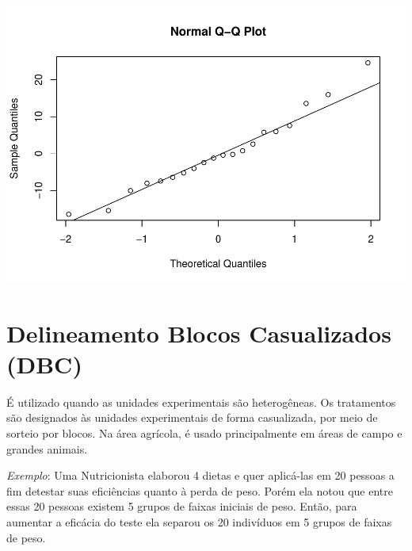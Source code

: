 \documentclass[12pt,brazil,]{book}
\begin{document}
\includegraphics{02-Delinexp_files/figure-latex/unnamed-chunk-8-1.pdf}

\hypertarget{delineamento-blocos-casualizados-dbc}{%
\section{Delineamento Blocos Casualizados
(DBC)}\label{delineamento-blocos-casualizados-dbc}}

É utilizado quando as unidades experimentais são heterogêneas. Os
tratamentos são designados às unidades experimentais de forma
casualizada, por meio de sorteio por blocos. Na área agrícola, é usado
principalmente em áreas de campo e grandes animais.

\emph{Exemplo}: Uma Nutricionista elaborou 4 dietas e quer aplicá-las em
20 pessoas a fim detestar suas eficiências quanto à perda de peso. Porém
ela notou que entre essas 20 pessoas existem 5 grupos de faixas iniciais
de peso. Então, para aumentar a eficácia do teste ela separou os 20
indivíduos em 5 grupos de faixas de peso.
\end{document}
